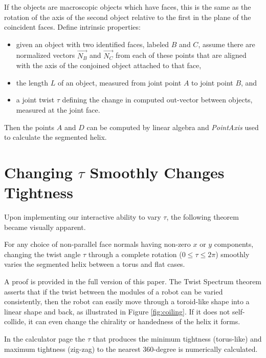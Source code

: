 \documentclass{svproc}
\begin{document}
If the objects are macroscopic objects which have faces, this is the same as the rotation
of the axis of the second object relative to the first in the plane of the coincident faces.
Define intrinsic properties:

\begin{itemize}
\item given an object with two identified faces, labeled $B$ and $C$, assume there are normalized
  vectors $\overrightarrow{N_B}$ and $\overrightarrow{N_C}$
  from each of these points that are aligned with the axis of the conjoined object attached to
  that face,
\item the length $L$ of an object, measured from joint point $A$ to joint point $B$, and
\item a joint twist $\tau$ defining the change in computed out-vector between objects,
  measured at the joint face.
\end{itemize}
Then the points $A$ and $D$ can be computed by linear algebra and {\em PointAxis} used to calculate the
segmented helix.

\section{Changing $\tau$ Smoothly Changes Tightness}

Upon implementing our interactive ability to vary $\tau$, the following
theorem became visually apparent.

\begin{theorem}
  For any choice of non-parallel face normals having non-zero $x$ or $y$ components,
  changing the twist angle $\tau$ through a complete rotation ($0 \leq \tau \leq 2\pi$)
  smoothly varies the segmented helix
  between a torus and flat cases.
\end{theorem}

A proof is provided in the full version of this paper\cite{readfullsegmentedhelix}.
The Twist Spectrum theorem asserts that if the twist between the modules of a robot
can be varied consistently, then the robot can easily move through a toroid-like shape
into a linear shape and back, as illustrated in Figure \ref{fig:coiling}. If it does not self-collide, it can even change the chirality
or handedness of the helix it forms.

In the calculator page
the $\tau$ that produces the minimum tightness (torus-like) and maximum tightness (zig-zag) to the
nearest 360-degree is numerically calculated.
\end{document}
